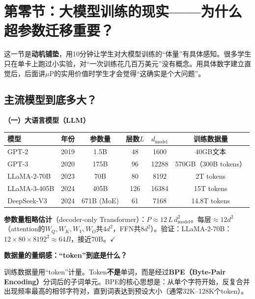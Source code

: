 \documentclass[11pt,a4paper]{article}
\begin{document}
\tableofcontents
\newpage

\section*{第零节：大模型训练的现实——为什么超参数迁移重要？}

\begin{teachingtip}
这一节是\textbf{动机铺垫}，用10分钟让学生对大模型训练的``体量''有具体感知。很多学生只在单卡上跑过小实验，对``一次训练花几百万美元''没有概念。用具体数字建立直觉后，后面讲$\mu$P的实用价值时学生才会觉得``这确实是个大问题''。
\end{teachingtip}

\subsection*{主流模型到底多大？}

\textbf{（一）大语言模型（LLM）}

\begin{center}
\renewcommand{\arraystretch}{1.3}
\begin{tabular}{llcccc}
\toprule
模型 & 年份 & 参数量 & 层数$L$ & $d_{\text{model}}$ & 训练数据量 \\
\midrule
GPT-2 & 2019 & 1.5B & 48 & 1600 & 40GB文本 \\
GPT-3 & 2020 & 175B & 96 & 12288 & 570GB（300B tokens）\\
LLaMA-2-70B & 2023 & 70B & 80 & 8192 & 2T tokens \\
LLaMA-3-405B & 2024 & 405B & 126 & 16384 & 15T tokens \\
DeepSeek-V3 & 2024 & 671B (MoE) & 61 & 7168 & 14.8T tokens \\
\bottomrule
\end{tabular}
\end{center}

\textbf{参数量粗略估计}（decoder-only Transformer）：$P \approx 12\,L\,d_{\text{model}}^2$。每层$\approx 12d^2$（attention的$W_Q,W_K,W_V,W_O$共$4d^2$，FFN共$8d^2$）。验证：LLaMA-2-70B：$12\times 80\times 8192^2\approx 64B$，接近70B。$\checkmark$

\textbf{数据量的量纲感：``token''到底是什么？}

训练数据量用``token''计量。Token\textbf{不是}单词，而是经过\textbf{BPE（Byte-Pair Encoding）}分词后的子词单元。BPE的核心思想是：从单个字符开始，反复合并出现频率最高的相邻字符对，直到词表达到预设大小（通常32K--128K个token）。
\end{document}
